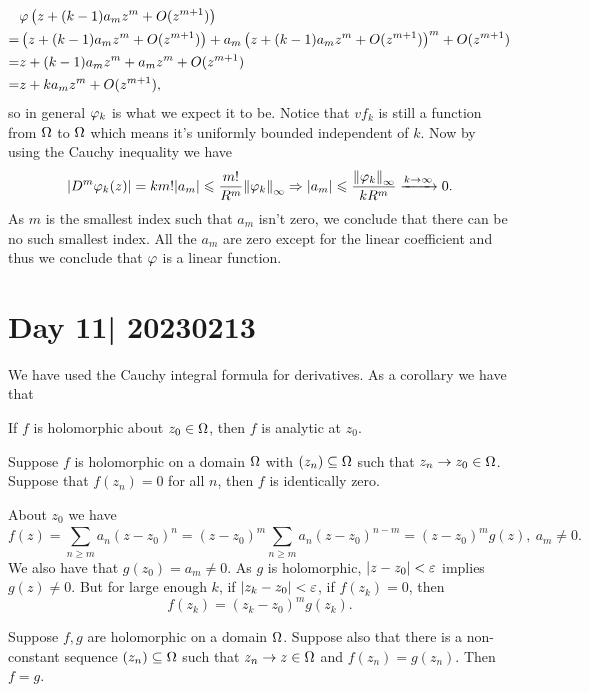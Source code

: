 \documentclass[12pt]{memoir}
\begin{document}
\begin{ptcbr}
   \begin{align*}
    &\varphi\left(z+(k-1)a_mz^{m}+O(z^{m+1})\right)\\
    =&\left(z+(k-1)a_mz^{m}+O(z^{m+1})\right)+a_m\left(z+(k-1)a_mz^{m}+O(z^{m+1})\right)^m+O(z^{m+1})\\
    =&z+(k-1)a_mz^m+a_mz^m+O(z^{m+1})\\
    =&z+ka_mz^m+O(z^{m+1}),
    \end{align*}
    so in general $\varphi_k$ is what we expect it to be. Notice that $vf_k$ is still a function from $\Omega$ to $\Omega$ which means it's uniformly bounded independent of $k$. Now by using the Cauchy inequality we have 
    $$\left|D^m\varphi_k(z)\right|=km!|a_m|\leqslant\frac{m!}{R^m}\norm{\varphi_k}_{\infty}\Rightarrow |a_m|\leqslant \frac{\norm{\varphi_k}_\infty}{kR^m}\xrightarrow{k\to\infty}0.$$
    As $m$ is the smallest index such that $a_m$ isn't zero, we conclude that there can be no such smallest index. All the $a_m$ are zero except for the linear coefficient and thus we conclude that $\varphi$ is a linear function.
\end{ptcbr}

\section{Day 11| 20230213}

We have used the Cauchy integral formula for derivatives. As a corollary we have that 

\begin{Cor}
    If $f$ is holomorphic about $z_0\in\Omega$, then $f$ is analytic at $z_0$.
\end{Cor}

\begin{Th}
    Suppose $f$ is holomorphic on a domain $\Omega$ with $(z_n)\subseteq\Omega$ such that $z_n\to z_0\in\Omega$. Suppose that $f(z_n)=0$ for all $n$, then $f$ is identically zero.
\end{Th}

\begin{ptcbp}
    About $z_0$ we have 
    $$f(z)=\sum_{n\geq m}^{}a_n(z-z_0)^n=(z-z_0)^m\sum_{n\geq m}^{}a_n(z-z_0)^{n-m}=(z-z_0)^mg(z),\ a_m\neq 0.$$
    We also have that $g(z_0)=a_m\neq 0$. As $g$ is holomorphic, $|z-z_0|<\varepsilon$ implies $g(z)\neq 0$. But for large enough $k$, if $|z_k-z_0|<\varepsilon$, if $f(z_k)=0$, then 
    $$f(z_k)=(z_k-z_0)^mg(z_k).$$
\end{ptcbp}

\begin{Th}
    Suppose $f,g$ are holomorphic on a domain $\Omega$. Suppose also that there is a non-constant sequence $(z_n)\subseteq\Omega$ such that $z_n\to z\in\Omega$ and $f(z_n)=g(z_n)$. Then $f=g$.
\end{Th}
\end{document}
